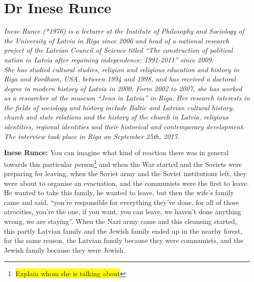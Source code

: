 \section{Dr Inese Runce}

\textit{Inese Runce (*1976) is a lecturer at the Institute of Philosophy and Sociology of the University of Latvia in Riga since 2006 and head of a national research project of the Latvian  Council of Science titled ``The construction  of political nation in Latvia after regaining independence: 1991-2011'' since 2009.\\
She has studied cultural studies, religion and religious education and history in Riga and Fordham, USA, between 1994 and 1998, and has received a doctoral degree in modern history of Latvia in 2000. Form 2002 to 2007, she has worked as a researcher at the museum ``Jews in Latvia'' in Riga. Her research interests in the fields of sociology and history include Baltic and Latvian cultural history, church and state relations and the history of the church in Latvia, religious identities, regional identities and their historical and contemporary development.\\
The interview took place in Riga on September 25th, 2017.}\par
\vspace*{2em}
\textbf{Inese Runce:} You can imagine what kind of reaction there was in general towards this particular person\footnote{\colorbox{yellow}{Explain whom she is talking about}} and when the War started and the Soviets were preparing for leaving, when the Soviet army and the Soviet institutions left, they were about to organise an evacuation, and the communists were the first to leave.  He wanted to take this family, he wanted to leave, but then the wife's family came and said, ``you're responsible for everything they've done, for all of those atrocities, you're the one, if you want, you can leave, we haven't done anything wrong, we are staying''. When the Nazi army came and this cleansing started, this partly Latvian family and the Jewish family ended up in the nearby forest, for the same reason, the Latvian family because they were communists, and the Jewish family because they were Jewish.\\
